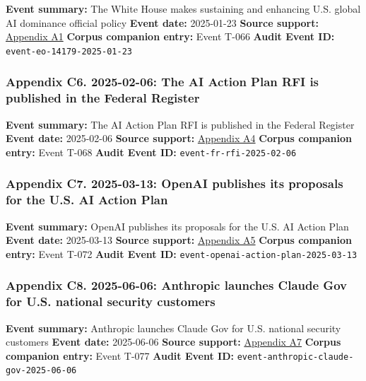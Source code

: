 \documentclass[
  american,
  11pt,
  letterpaper,
]{article}
\begin{document}
\textbf{Event summary:} The White House makes sustaining and enhancing
U.S. global AI dominance official policy \textbf{Event date:} 2025-01-23
\textbf{Source support:}
\hyperref[appendix-a1-removing-barriers-to-american-leadership-in-artificial-intelligence]{Appendix
A1} \textbf{Corpus companion entry:} Event T-066 \textbf{Audit Event
ID:} \texttt{event-eo-14179-2025-01-23}

\subsubsection{Appendix C6. 2025-02-06: The AI Action Plan RFI is
published in the Federal
Register}\label{appendix-c6-2025-02-06-the-ai-action-plan-rfi-is-published-in-the-federal-register}

\textbf{Event summary:} The AI Action Plan RFI is published in the
Federal Register \textbf{Event date:} 2025-02-06 \textbf{Source
support:}
\hyperref[appendix-a4-request-for-information-on-the-development-of-an-artificial-intelligence-ai-action-plan]{Appendix
A4} \textbf{Corpus companion entry:} Event T-068 \textbf{Audit Event
ID:} \texttt{event-fr-rfi-2025-02-06}

\subsubsection{Appendix C7. 2025-03-13: OpenAI publishes its proposals
for the U.S. AI Action
Plan}\label{appendix-c7-2025-03-13-openai-publishes-its-proposals-for-the-u-s-ai-action-plan}

\textbf{Event summary:} OpenAI publishes its proposals for the U.S. AI
Action Plan \textbf{Event date:} 2025-03-13 \textbf{Source support:}
\hyperref[appendix-a5-openais-proposals-for-the-us-ai-action-plan]{Appendix
A5} \textbf{Corpus companion entry:} Event T-072 \textbf{Audit Event
ID:} \texttt{event-openai-action-plan-2025-03-13}

\subsubsection{Appendix C8. 2025-06-06: Anthropic launches Claude Gov
for U.S. national security
customers}\label{appendix-c8-2025-06-06-anthropic-launches-claude-gov-for-u-s-national-security-customers}

\textbf{Event summary:} Anthropic launches Claude Gov for U.S. national
security customers \textbf{Event date:} 2025-06-06 \textbf{Source
support:}
\hyperref[appendix-a7-claude-gov-models-for-u-s-national-security-customers]{Appendix
A7} \textbf{Corpus companion entry:} Event T-077 \textbf{Audit Event
ID:} \texttt{event-anthropic-claude-gov-2025-06-06}
\end{document}
